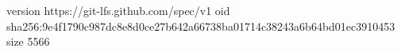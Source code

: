 version https://git-lfs.github.com/spec/v1
oid sha256:9e4f1790c987dc8e8d0ce27b642a66738ba01714c38243a6b64bd01ec3910453
size 5566
